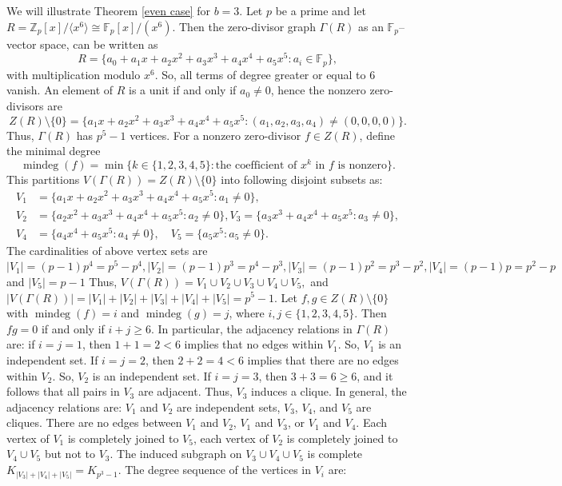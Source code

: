 \documentclass[12pt,twoside]{article}
\begin{document}
	We will illustrate Theorem \ref{even case} for $b=3$.	Let $p$ be a prime and let $R=\mathbb{Z}_p[x]/\langle x^6\rangle \cong \mathbb{F}_p[x]/(x^6).$
	Then the zero-divisor graph  $ \varGamma(R)$  as an $\mathbb{F}_p$--vector space, can be written as
	\[
	R = \{a_0 + a_1x + a_2x^2 + a_3x^3 + a_4x^4 + a_5x^5 : a_i \in \mathbb{F}_p\},
	\]
	with multiplication modulo $x^6$. So, all terms of degree greater or equal to $6$ vanish. An element of $R$ is a unit if and only if $a_0 \neq 0$, hence the nonzero zero-divisors are
	\[
	Z(R)\setminus\{0\}
	= \{a_1x + a_2x^2 + a_3x^3 + a_4x^4 + a_5x^5 : (a_1,a_2,a_3,a_4)\neq (0,0,0,0)\}.
	\]
	Thus, $ \varGamma(R)$ has $p^5 - 1$ vertices.  For a nonzero zero-divisor $f\in Z(R)$, define the minimal degree
	\[
	\operatorname{mindeg}(f)
	= \min\{k \in \{1,2,3,4,5\} : \text{the coefficient of } x^k \text{ in } f \text{ is nonzero}\}.
	\]
	This partitions $V( \varGamma(R))=Z(R)\setminus\{0\}$ into following disjoint subsets as:
	\[
	\begin{aligned}
		V_1 &= \{a_1x + a_2x^2 + a_3x^3 + a_4x^4 + a_5x^5 : a_1 \neq 0\},\\
		V_2 &= \{a_2x^2 + a_3x^3 + a_4x^4 + a_5x^5 : a_2 \neq 0\},	V_3 = \{a_3x^3 + a_4x^4 + a_5x^5 : a_3 \neq 0\},\\
		V_4 &= \{a_4x^4 + a_5x^5 : a_4 \neq 0\}, \quad V_5 = \{a_5x^5 : a_5 \neq 0\}.
	\end{aligned}
	\]
	The cardinalities of above vertex sets are $ |V_1|= (p-1)p^4 = p^5 - p^4, |V_2| = (p-1)p^3 = p^4 - p^3, |V_3| = (p-1)p^2 = p^3 - p^2, |V_4| = (p-1)p   = p^2 - p$ and $ |V_5| = p-1$
	Thus, $V( \varGamma(R)) = V_1 \cup V_2 \cup V_3 \cup V_4 \cup V_5,$ and $|V( \varGamma(R))|=|V_1|+|V_2|+|V_3|+|V_4|+|V_5| = p^5 - 1.$  Let $f,g\in Z(R)\setminus\{0\}$ with $\operatorname{mindeg}(f)=i$ and
	$\operatorname{mindeg}(g)=j$, where $i,j\in\{1,2,3,4,5\}$. Then $fg = 0$  if and only if  $i+j \ge 6.$
	In particular, the adjacency relations in $ \varGamma(R)$ are: if $i=j=1$, then $1+1=2<6$ implies that no edges within $V_1$. So, $V_1$ is an independent set. If  $i=j=2$, then  $2+2=4<6$ implies that there are no edges within $V_2$. So, $V_2$ is an independent set. If  $i=j=3$, then $3+3=6\ge 6$, and it follows that all pairs in $V_3$ are adjacent. Thus, $V_3$ induces a clique.  In general, the adjacency relations are: $V_1$ and $V_2$ are independent sets, $V_3$, $V_4$, and $V_5$ are cliques. There  are no edges between $V_1$ and $V_2$, $V_1$ and $V_3$, or $V_1$ and $V_4$. Each vertex of $V_1$ is completely joined to $V_5$, each vertex of $V_2$ is completely joined to $V_4\cup V_5$ but not to $V_3$.  The induced subgraph on $V_3\cup V_4\cup V_5$ is complete $ K_{|V_3|+|V_4|+|V_5|}= K_{p^3-1}. $ The degree sequence of the vertices in $V_{i}$ are:
\end{document}
